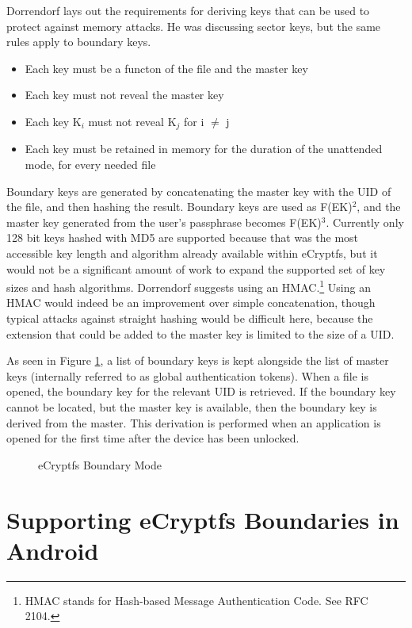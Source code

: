 Dorrendorf \citeyear{Dorrendorf2011} lays out the requirements for deriving keys that can be used to protect against memory attacks.
He was discussing sector keys, but the same rules apply to boundary keys.
\begin{itemize}
\item{Each key must be a functon of the file and the master key}
\item{Each key must not reveal the master key}
\item{Each key K$_i$ must not reveal K$_j$ for i $\not=$ j}
\item{Each key must be retained in memory for the duration of the unattended mode, for every needed file}
\end{itemize}
Boundary keys are generated by concatenating the master key with the UID of the file, and then hashing the result.  Boundary keys
are used as F(EK)$^{2}$, and the master key generated from the user's passphrase becomes F(EK)$^{3}$. Currently only 128 bit keys
hashed with MD5 are supported because that was the most accessible key length and algorithm already available within eCryptfs, but
it would not be a significant amount of work to expand the supported set of key sizes and hash algorithms.  Dorrendorf
\citeyear{Dorrendorf2011} suggests using an HMAC.\footnote{HMAC stands for Hash-based Message Authentication Code. See RFC 2104.}
Using an HMAC would indeed be an improvement over simple concatenation, though typical attacks against straight hashing would be
difficult here, because the extension that could be added to the master key is limited to the size of a UID.

As seen in Figure \ref{fig:ecryptfsboundary}, a list of boundary keys is kept alongside the list of master keys (internally referred
to as global authentication tokens).  When a file is opened, the boundary key for the relevant UID is retrieved. If the boundary key
cannot be located, but the master key is available, then the boundary key is derived from the master. This derivation is performed
when an application is opened for the first time after the device has been unlocked.

\begin{figure}[!htb] 
\begin{center}
\end{center}
\caption{eCryptfs Boundary Mode} \label{fig:ecryptfsboundary} \end{figure}

\section{Supporting eCryptfs Boundaries in Android}

